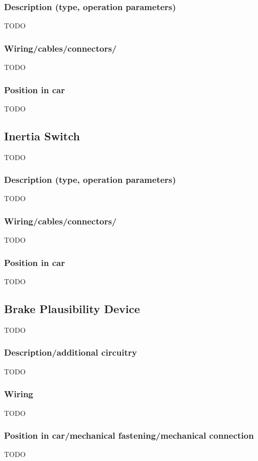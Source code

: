 \documentclass{article}
\begin{document}
\subsubsection{Description (type, operation parameters)}
TODO

\subsubsection{Wiring/cables/connectors/}
TODO

\subsubsection{Position in car}
TODO

\subsection{Inertia Switch}
TODO

\subsubsection{Description (type, operation parameters)}
TODO

\subsubsection{Wiring/cables/connectors/}
TODO

\subsubsection{Position in car}
TODO

\subsection{Brake Plausibility Device}
TODO

\subsubsection{Description/additional circuitry}
TODO

\subsubsection{Wiring}
TODO

\subsubsection{Position in car/mechanical fastening/mechanical connection}
TODO
\end{document}
